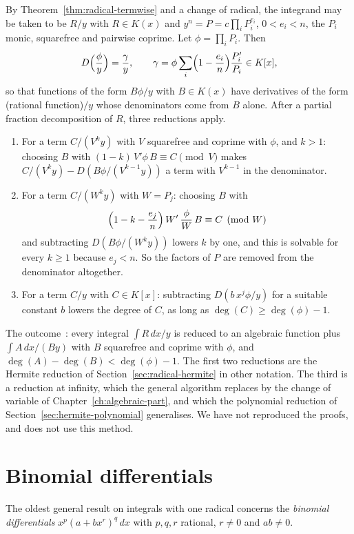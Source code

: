 By Theorem~\ref{thm:radical-termwise} and a change of radical, the integrand
may be taken to be $R/y$ with $R \in K(x)$ and $y^n = P = c \prod_i P_i^{e_i}$,
$0 < e_i < n$, the $P_i$ monic, squarefree and pairwise coprime. Let $\phi =
\prod_i P_i$. Then
\[
  D\Bigl( \frac{\phi}{y} \Bigr) = \frac{\gamma}{y}, \qquad
  \gamma = \phi \sum_i \Bigl( 1 - \frac{e_i}{n} \Bigr) \frac{P_i'}{P_i} \in K[x] ,
\]
so that functions of the form $B \phi / y$ with $B \in K(x)$ have derivatives
of the form (rational function)$/y$ whose denominators come from $B$ alone.
After a partial fraction decomposition of $R$, three reductions apply.
\begin{enumerate}
\item For a term $C/(V^k y)$ with $V$ squarefree and coprime with $\phi$, and
  $k > 1$: choosing $B$ with $(1 - k)\, V' \phi\, B \equiv C \pmod V$ makes
  $C/(V^k y) - D(B \phi / (V^{k-1} y))$ a term with $V^{k-1}$ in the
  denominator.
\item For a term $C/(W^k y)$ with $W = P_j$: choosing $B$ with
  \[
    \Bigl( 1 - k - \frac{e_j}{n} \Bigr)\, W'\, \frac{\phi}{W}\, B \equiv C \pmod W
  \]
  and subtracting $D(B \phi / (W^k y))$ lowers $k$ by one, and this is
  solvable for every $k \ge 1$ because $e_j < n$. So the factors of $P$ are
  removed from the denominator altogether.
\item For a term $C/y$ with $C \in K[x]$: subtracting $D(b\, x^j \phi / y)$
  for a suitable constant $b$ lowers the degree of $C$, as long as $\deg(C)
  \ge \deg(\phi) - 1$.
\end{enumerate}
The outcome~\cite[\S A.3]{trager1984}: every integral $\int R\,dx/y$ is
reduced to an algebraic function plus $\int A\,dx/(B y)$ with $B$ squarefree
and coprime with $\phi$, and $\deg(A) - \deg(B) < \deg(\phi) - 1$. The first two reductions are the
Hermite reduction of Section~\ref{sec:radical-hermite} in other notation.
The third is a reduction at infinity, which the general algorithm replaces by
the change of variable of Chapter~\ref{ch:algebraic-part}, and which the
polynomial reduction of Section~\ref{sec:hermite-polynomial} generalises. We
have not reproduced the proofs, and  does not use
this method.

\section{Binomial differentials}\label{sec:radical-chebyshev}

The oldest general result on integrals with one radical concerns the
\emph{binomial differentials} $x^p (a + b x^r)^q\,dx$ with $p, q, r$
rational, $r \ne 0$ and $a b \ne 0$.

